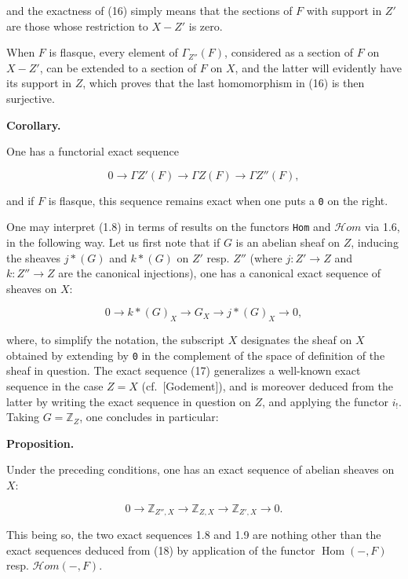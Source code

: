 \documentclass[
]{article}
\begin{document}
and the exactness of (16) simply means that the sections of \(F\) with
support in \(Z'\) are those whose restriction to \(X - Z'\) is zero.

When \(F\) is flasque, every element of \(\Gamma_{Z''}(F)\), considered
as a section of \(F\) on \(X - Z'\), can be extended to a section of
\(F\) on \(X\), and the latter will evidently have its support in \(Z\),
which proves that the last homomorphism in (16) is then surjective.

\textbf{Corollary.}

One has a functorial exact sequence

\[
0 \longrightarrow \Gamma Z'(F) \longrightarrow \Gamma Z(F) \longrightarrow \Gamma Z''(F),
\]

and if \(F\) is flasque, this sequence remains exact when one puts a
\texttt{0} on the right.

One may interpret (1.8) in terms of results on the functors \texttt{Hom}
and \(\mathcal{H}om\) via 1.6, in the following way. Let us first note
that if \(G\) is an abelian sheaf on \(Z\), inducing the sheaves
\(j*(G)\) and \(k*(G)\) on \(Z'\) resp. \(Z''\) (where \(j: Z' \to Z\)
and \(k: Z'' \to Z\) are the canonical injections), one has a canonical
exact sequence of sheaves on \(X\):

\[
0 \longrightarrow k*(G)_{X} \longrightarrow G_{X} \longrightarrow j*(G)_{X} \longrightarrow 0,
\]

where, to simplify the notation, the subscript \(X\) designates the
sheaf on \(X\) obtained by extending by \texttt{0} in the complement of
the space of definition of the sheaf in question. The exact sequence
(17) generalizes a well-known exact sequence in the case \(Z = X\)
(cf.~{[}Godement{]}), and is moreover deduced from the latter by writing
the exact sequence in question on \(Z\), and applying the functor
\(i_{!}\). Taking \(G = \mathbb{Z}_{Z}\), one concludes in particular:

\textbf{Proposition.}

Under the preceding conditions, one has an exact sequence of abelian
sheaves on \(X\):

\[
0 \longrightarrow \mathbb{Z}_{Z'',X} \longrightarrow \mathbb{Z}_{Z,X} \longrightarrow \mathbb{Z}_{Z',X} \longrightarrow 0.
\]

This being so, the two exact sequences 1.8 and 1.9 are nothing other
than the exact sequences deduced from (18) by application of the functor
\(\operatorname{Hom}(-, F)\) resp. \(\mathcal{H}om(-, F)\).
\end{document}
